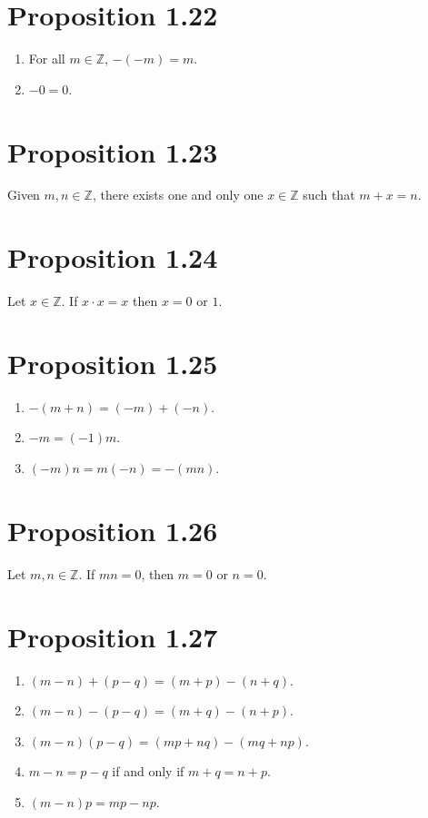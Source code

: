 \section*{Proposition 1.22}
\begin{enumerate}[label=(\roman*)]
    \item For all $m \in \mathbb{Z}$, $-(−m) = m$.
    \item $-0 = 0$.
\end{enumerate}

\section*{Proposition 1.23}
Given $m, n \in \mathbb{Z}$, there exists one and only one $x \in \mathbb{Z}$ such that $m+x = n$.

\section*{Proposition 1.24}
Let $x \in \mathbb{Z}$. If $x \cdot x = x$ then $x = 0$ or $1$.

\section*{Proposition 1.25}
\begin{enumerate}[label=(\roman*)]
    \item $-(m+n) = (-m) + (-n)$.
    \item $-m = (-1)m$.
    \item $(-m)n = m(-n) = -(mn)$.
\end{enumerate}

\section*{Proposition 1.26}
Let $m, n \in \mathbb{Z}$. If $mn = 0$, then $m = 0$ or $n = 0$.

\section*{Proposition 1.27}
\begin{enumerate}[label=(\roman*)]
    \item $(m-n) + (p-q) = (m+p) - (n+q)$.
    \item $(m-n) - (p-q) = (m+q) - (n+p)$.
    \item $(m-n)(p-q) = (mp+nq) - (mq+np)$.
    \item $m-n = p-q$ if and only if $m+q = n+p$.
    \item $(m-n)p = mp - np$.
\end{enumerate}

